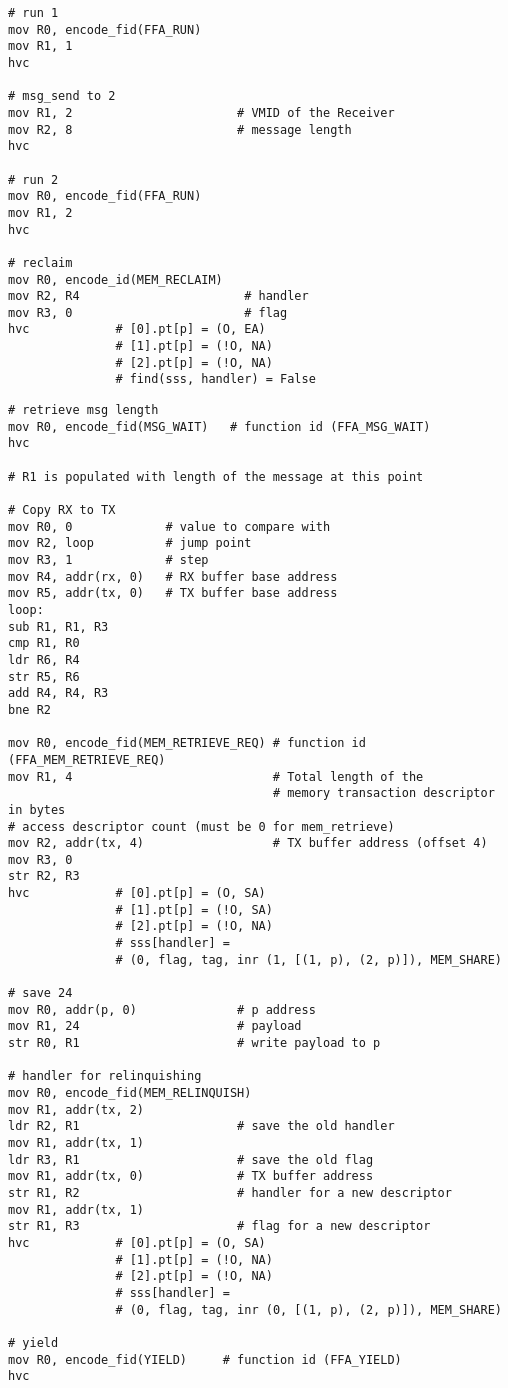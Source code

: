 \documentclass{article}
\begin{document}
\begin{lstlisting}[caption={VM 0}]
# run 1
mov R0, encode_fid(FFA_RUN)
mov R1, 1
hvc

# msg_send to 2
mov R1, 2                       # VMID of the Receiver
mov R2, 8                       # message length
hvc

# run 2
mov R0, encode_fid(FFA_RUN)
mov R1, 2
hvc

# reclaim
mov R0, encode_id(MEM_RECLAIM)
mov R2, R4                       # handler
mov R3, 0                        # flag
hvc            # [0].pt[p] = (O, EA)
               # [1].pt[p] = (!O, NA)
               # [2].pt[p] = (!O, NA)
               # find(sss, handler) = False       
\end{lstlisting}

\begin{lstlisting}[caption={VM 1}]
# retrieve msg length
mov R0, encode_fid(MSG_WAIT)   # function id (FFA_MSG_WAIT)
hvc

# R1 is populated with length of the message at this point

# Copy RX to TX
mov R0, 0             # value to compare with
mov R2, loop          # jump point
mov R3, 1             # step
mov R4, addr(rx, 0)   # RX buffer base address
mov R5, addr(tx, 0)   # TX buffer base address
loop:
sub R1, R1, R3
cmp R1, R0
ldr R6, R4
str R5, R6
add R4, R4, R3
bne R2

mov R0, encode_fid(MEM_RETRIEVE_REQ) # function id (FFA_MEM_RETRIEVE_REQ)
mov R1, 4                            # Total length of the  
                                     # memory transaction descriptor in bytes
# access descriptor count (must be 0 for mem_retrieve)
mov R2, addr(tx, 4)                  # TX buffer address (offset 4)
mov R3, 0
str R2, R3                                    
hvc            # [0].pt[p] = (O, SA)
               # [1].pt[p] = (!O, SA)
               # [2].pt[p] = (!O, NA)
               # sss[handler] = 
               # (0, flag, tag, inr (1, [(1, p), (2, p)]), MEM_SHARE)

# save 24
mov R0, addr(p, 0)              # p address
mov R1, 24                      # payload
str R0, R1                      # write payload to p

# handler for relinquishing
mov R0, encode_fid(MEM_RELINQUISH)
mov R1, addr(tx, 2)
ldr R2, R1                      # save the old handler
mov R1, addr(tx, 1)
ldr R3, R1                      # save the old flag
mov R1, addr(tx, 0)             # TX buffer address
str R1, R2                      # handler for a new descriptor
mov R1, addr(tx, 1)
str R1, R3                      # flag for a new descriptor
hvc            # [0].pt[p] = (O, SA)
               # [1].pt[p] = (!O, NA)
               # [2].pt[p] = (!O, NA)
               # sss[handler] = 
               # (0, flag, tag, inr (0, [(1, p), (2, p)]), MEM_SHARE)

# yield
mov R0, encode_fid(YIELD)     # function id (FFA_YIELD)
hvc
\end{lstlisting}
\end{document}
